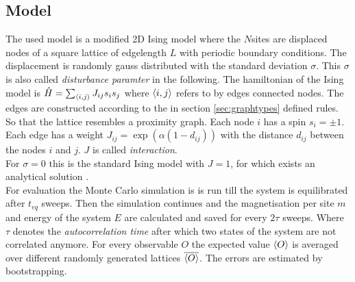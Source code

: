 \subsection{Model}
    The used model is a modified 2D Ising model where the \(N\)sites are
    displaced nodes of a square lattice of edgelength \(L\) with
    periodic boundary conditions. The displacement is randomly gauss
    distributed with the standard deviation \(\sigma\). This \(\sigma\)
    is also called \emph{disturbance paramter} in the following.
    The hamiltonian of the Ising model is
    \(\hat{H} = \sum_{\left< i,j \right>}J_{ij}s_{i}s_{j}\)
    where \(\left< i,j \right>\) refers to by edges connected nodes.
    The edges are constructed according to the in section
    \ref{sec:graphtypes} defined rules. So that the lattice resembles a
    proximity graph. Each node \(i\) has a spin \(s_i = \pm 1\). Each
    edge has a weight \(J_{ij} = \exp (\alpha (1-d_{ij}))\) with the
    distance \(d_{ij}\) between the nodes \(i\) and \(j\). \(J\) is
    called \emph{interaction}.\\
    For \(\sigma = 0\) this is the standard Ising model with \(J = 1\),
    for which exists an analytical solution \cite{Onsager1944}.\\

    For evaluation the Monte Carlo simulation is is run till the system
    is equilibrated after \(t_{eq}\) sweeps. Then the simulation continues
    and the magnetisation per site \(m\) and energy of the system \(E\)
    are calculated and saved for every \(2\tau\) sweeps. Where \(\tau\)
    denotes the \emph{autocorrelation time} after which two states of
    the system are not correlated anymore.
    For every observable \(O\) the expected value \(\left< O \right>\) is averaged
    over different randomly generated lattices \(\overline{\left< O \right>}\). The
    errors are estimated by bootstrapping.

